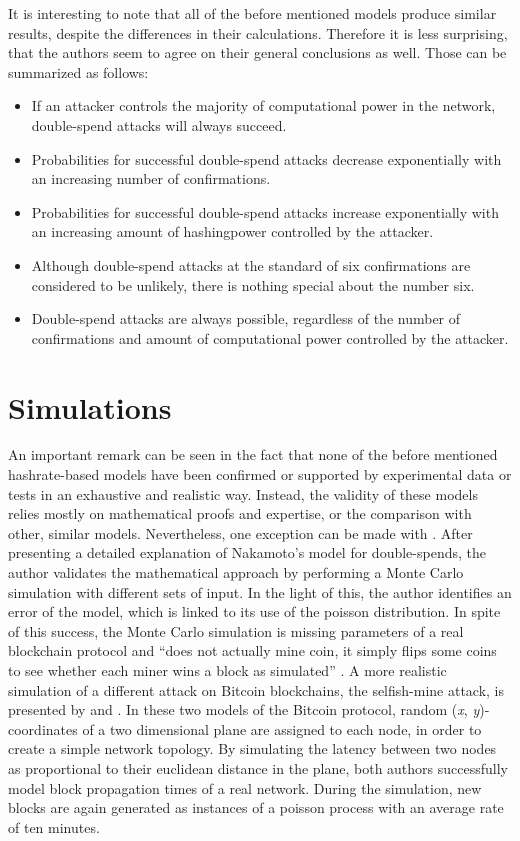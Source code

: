 \documentclass[a4paper,12pt,twoside]{report}
\begin{document}
It is interesting to note that all of the before mentioned models produce similar results, despite the differences in their calculations. Therefore it is less surprising, that the authors seem to agree on their general conclusions as well. Those can be summarized as follows:
\begin{itemize}
\item If an attacker controls the majority of computational power in the network, double-spend attacks will always succeed.
\item Probabilities for successful double-spend attacks decrease exponentially with an increasing number of confirmations.
\item Probabilities for successful double-spend attacks increase exponentially with an increasing amount of hashingpower controlled by the attacker.
\item Although double-spend attacks at the standard of six confirmations are considered to be unlikely, there is nothing special about the number six.
\item Double-spend attacks are always possible, regardless of the number of confirmations and amount of computational power controlled by the attacker.
\end{itemize}
\section{Simulations}
An important remark can be seen in the fact that none of the before mentioned hashrate-based models have been confirmed or supported by experimental data or tests in an exhaustive and realistic way. Instead, the validity of these models relies mostly on mathematical proofs and expertise, or the comparison with other, similar models. Nevertheless, one exception can be made with \cite{NakamotoExplMCSim}. After presenting a detailed explanation of Nakamoto's model for double-spends, the author validates the mathematical approach by performing a Monte Carlo simulation \cite{montecarlo} with different sets of input. In the light of this, the author identifies an error of the model, which is linked to its use of the poisson distribution. In spite of this success, the Monte Carlo simulation is missing parameters of a real blockchain protocol and ``does not actually
mine coin, it simply flips some coins to see whether each miner wins a block as simulated'' \cite{NakamotoExplMCSim}. A more realistic simulation of a different attack on Bitcoin blockchains, the selfish-mine attack, is presented by \cite{mwalemodel} and \cite{selfishmine2}. In these two models of the Bitcoin protocol, random (\textit{x}, \textit{y})-coordinates of a two dimensional plane are assigned to each node, in order to create a simple network topology. By simulating the latency between two nodes as proportional to their euclidean distance in the plane, both authors successfully model block propagation times of a real network. During the simulation, new blocks are again generated as instances of a poisson process with an average rate of ten minutes. 
\end{document}
